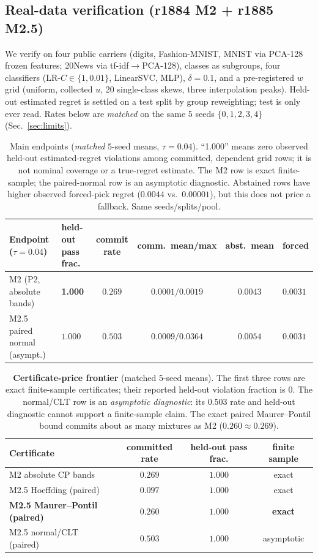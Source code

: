\documentclass{article}
\begin{document}
\subsection{Real-data verification (r1884 M2 + r1885 M2.5)}
We verify on four public carriers (digits, Fashion-MNIST, MNIST via PCA-128 frozen features;
20News via tf-idf$\to$PCA-128), classes as subgroups, four classifiers (LR-$C{\in}\{1,0.01\}$,
LinearSVC, MLP), $\delta{=}0.1$, and a pre-registered $w$ grid (uniform, collected $u$, 20
single-class skews, three interpolation peaks). Held-out estimated regret is settled on a test
split by group reweighting; test is only ever read. Rates below are \emph{matched} on the
same $5$ seeds $\{0,1,2,3,4\}$ (Sec.~\ref{sec:limits}).

\FloatBarrier
\begin{table}[H]
\centering\small\setlength{\tabcolsep}{3pt}
\begin{tabular}{llcccl}
\toprule
Endpoint ($\tau{=}0.04$) & held-out pass frac. & commit rate &
 comm.\ mean/max & abst.\ mean & forced \\
\midrule
M2 ($\mathrm{P2}$, absolute bands) &
 \textbf{1.000} & $0.269$ &
 $0.0001/0.0019$ & $0.0043$ & $0.0031$ \\
M2.5 paired normal (asympt.) &
 $1.000$ & $0.503$ &
 $0.0009/0.0364$ & $0.0054$ & $0.0031$ \\
\bottomrule
\end{tabular}
\caption{Main endpoints (\emph{matched} $5$-seed means, $\tau{=}0.04$). ``1.000'' means
zero observed held-out estimated-regret violations among committed, dependent grid rows; it is
not nominal coverage or a true-regret estimate. The M2 row is exact finite-sample; the
paired-normal row is an asymptotic diagnostic. Abstained rows have higher observed forced-pick regret
($0.0044$ vs.\ $0.00001$), but this does not price a fallback. Same seeds/splits/pool.}
\label{tab:main}
\end{table}

\begin{table}[H]
\centering\small
\begin{tabular}{lccc}
\toprule
Certificate & committed rate & held-out pass frac. & finite sample \\
\midrule
M2 absolute CP bands & $0.269$ & $1.000$ & exact \\
M2.5 Hoeffding (paired) & $0.097$ & $1.000$ & exact \\
\bfseries M2.5 Maurer--Pontil (paired) &
 \bfseries $0.260$ & \bfseries $1.000$ & \bfseries exact \\
M2.5 normal/CLT (paired) &
 $0.503$ & $1.000$ & asymptotic \\
\bottomrule
\end{tabular}
\caption{\textbf{Certificate-price frontier} (matched $5$-seed means). The first three rows
are exact finite-sample certificates; their reported held-out violation fraction is $0$. The
normal/CLT row is an \emph{asymptotic diagnostic}: its $0.503$ rate and held-out diagnostic
cannot support a finite-sample claim. The exact paired Maurer--Pontil bound commits about as
many mixtures as M2 ($0.260\approx0.269$).}
\label{tab:frontier}
\end{table}
\end{document}
